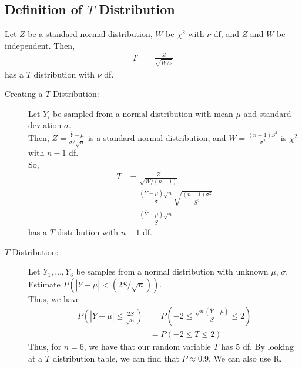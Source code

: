 \documentclass[10pt]{extarticle}
\begin{document}
\subsection{Definition of $T$ Distribution}%
  Let $Z$ be a standard normal distribution, $W$ be $\chi^2$ with $\nu$ df, and $Z$ and $W$ be independent. Then,
  \begin{align*}
    T &= \frac{Z}{\sqrt{W/\nu}}
  \end{align*}
  has a $T$ distribution with $\nu$ df.
  \begin{description}
    \item[Creating a $T$ Distribution:] Let $Y_i$ be sampled from a normal distribution with mean $\mu$ and standard deviation $\sigma$.\\
      
      Then, $Z = \frac{\overline{Y}-\mu}{\sigma/\sqrt{n}}$ is a standard normal distribution, and $W = \frac{(n-1)S^2}{\sigma^2}$ is $\chi^2$ with $n-1$ df.\\

      So,
      \begin{align*}
        T &= \frac{Z}{\sqrt{W/(n-1)}}\\
          &= \frac{(\overline{Y}-\mu)\sqrt{n}}{\sigma}\sqrt{\frac{(n-1)\sigma^2}{S^2}}\\
          &= \frac{(\overline{Y}-\mu)\sqrt{n}}{S}
      \end{align*}
      has a $T$ distribution with $n-1$ df.
    \item[$T$ Distribution:] Let $Y_1,\dots,Y_6$ be samples from a normal distribution with unknown $\mu$, $\sigma$. Estimate $P(|\overline{Y}-\mu|<(2S/\sqrt{n}))$.\\

      Thus, we have
      \begin{align*}
        P\left(|\overline{Y}-\mu| \leq \frac{2S}{\sqrt{n}}\right) &= P\left(-2\leq \frac{\sqrt{n}(\overline{Y}-\mu)}{S}\leq 2\right)\\
                                                                  &= P(-2 \leq T \leq 2)
      \end{align*}
      Thus, for $n=6$, we have that our random variable $T$ has 5 df. By looking at a $T$ distribution table, we can find that $P \approx 0.9$. We can also use R.
  \end{description}
\end{document}
